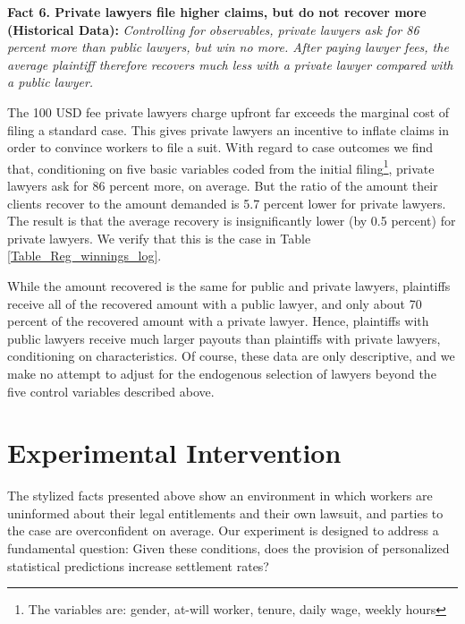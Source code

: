\documentclass[11pt, a4paper]{article}
\begin{document}
\vspace{.15in}
\textbf{Fact 6. Private lawyers file higher claims, but do not recover more (Historical Data):} \emph{Controlling for observables, private lawyers ask for 86 percent more than public lawyers, but win no more. After paying lawyer fees, the average plaintiff therefore recovers much less with a private lawyer compared with a public lawyer.}
\vspace{.07in}

 The 100 USD fee private lawyers charge upfront far exceeds the  marginal cost of filing a standard case. This gives private lawyers an incentive to inflate claims in order to convince workers to file a suit. With regard to case outcomes we find that, conditioning on five basic variables coded from the initial filing\footnote{The variables are: gender, at-will worker, tenure, daily wage, weekly hours}, private lawyers ask for 86 percent more, on average. But the ratio of the amount their clients recover to the amount demanded is 5.7 percent lower for private lawyers. The result is that the average recovery is insignificantly lower (by 0.5 percent) for private lawyers. We verify that this is the case in Table \ref{Table_Reg_winnings_log}. 

While the amount recovered is the same for public and private lawyers, plaintiffs receive all of the recovered amount with a public lawyer, and only about 70 percent of the recovered amount with a private lawyer. Hence, plaintiffs with public lawyers receive much larger payouts than plaintiffs with private lawyers, conditioning on characteristics. Of course, these data are only descriptive, and we make no attempt to adjust for  the endogenous selection of lawyers beyond the five control variables described above.   


\section{Experimental Intervention}  \label{ExperimentSection}

The stylized facts presented above show an environment in which workers are uninformed about their legal entitlements and their own lawsuit, and parties to the case are overconfident on average. Our experiment is designed to address a fundamental question: Given these conditions, does the provision of personalized statistical predictions increase settlement rates? 
\end{document}

